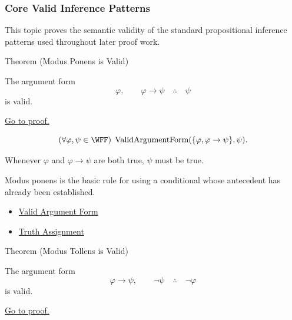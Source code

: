 \subsubsection*{Core Valid Inference Patterns}

\begin{remark*}
This topic proves the semantic validity of the standard propositional inference
patterns used throughout later proof work.
\end{remark*}

\begin{theorembox}{Theorem (Modus Ponens is Valid)}
\begin{theorem}
\label{thm:modus-ponens-validity-propositional-logic}
The argument form
\[
\varphi,\qquad \varphi\to\psi \quad\therefore\quad \psi
\]
is valid.

\noindent\hyperref[prf:modus-ponens-validity-propositional-logic]{Go to proof.}
\end{theorem}
\end{theorembox}

\begin{remark*}
\[
(\forall\varphi,\psi\in\WFF)\;\operatorname{ValidArgumentForm}(\{\varphi,\varphi\to\psi\},\psi).
\]
\end{remark*}

\begin{remark*}
Whenever \(\varphi\) and \(\varphi\to\psi\) are both true, \(\psi\) must be true.
\end{remark*}

\begin{remark*}[Interpretation]
Modus ponens is the basic rule for using a conditional whose antecedent has
already been established.
\end{remark*}

\begin{dependencies}
\begin{itemize}
  \item \hyperref[def:valid-argument-form-propositional-logic]{Valid Argument Form}
  \item \hyperref[def:truth-assignment-propositional-logic]{Truth Assignment}
\end{itemize}
\end{dependencies}

\begin{theorembox}{Theorem (Modus Tollens is Valid)}
\begin{theorem}
\label{thm:modus-tollens-validity-propositional-logic}
The argument form
\[
\varphi\to\psi,\qquad \neg\psi \quad\therefore\quad \neg\varphi
\]
is valid.

\noindent\hyperref[prf:modus-tollens-validity-propositional-logic]{Go to proof.}
\end{theorem}
\end{theorembox}

